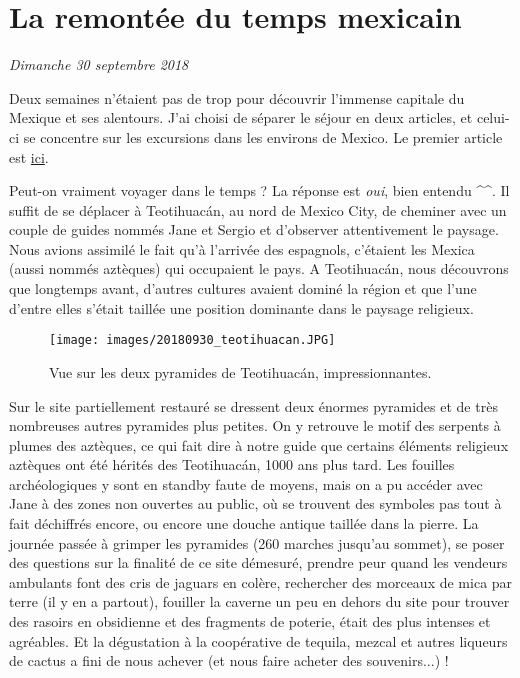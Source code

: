\hypertarget{la-remontuxe9e-du-temps-mexicain}{%
\section{La remontée du temps
mexicain}\label{la-remontuxe9e-du-temps-mexicain}}

\emph{Dimanche 30 septembre 2018}

Deux semaines n'étaient pas de trop pour découvrir l'immense capitale du
Mexique et ses alentours. J'ai choisi de séparer le séjour en deux
articles, et celui-ci se concentre sur les excursions dans les environs
de Mexico. Le premier article est
\href{/immersion-culturelle-mexico.html}{ici}.

Peut-on vraiment voyager dans le temps ? La réponse est \emph{oui}, bien
entendu \^{}\^{}. Il suffit de se déplacer à Teotihuacán, au nord de
Mexico City, de cheminer avec un couple de guides nommés Jane et Sergio
et d'observer attentivement le paysage. Nous avions assimilé le fait
qu'à l'arrivée des espagnols, c'étaient les Mexica (aussi nommés
aztèques) qui occupaient le pays. A Teotihuacán, nous découvrons que
longtemps avant, d'autres cultures avaient dominé la région et que l'une
d'entre elles s'était taillée une position dominante dans le paysage
religieux.

\begin{figure}
\centering
\texttt{[image: images/20180930\_teotihuacan.JPG]}
\caption{Vue sur les deux pyramides de Teotihuacán, impressionnantes.}
\end{figure}

Sur le site partiellement restauré se dressent deux énormes pyramides et
de très nombreuses autres pyramides plus petites. On y retrouve le motif
des serpents à plumes des aztèques, ce qui fait dire à notre guide que
certains éléments religieux aztèques ont été hérités des Teotihuacán,
1000 ans plus tard. Les fouilles archéologiques y sont en standby faute
de moyens, mais on a pu accéder avec Jane à des zones non ouvertes au
public, où se trouvent des symboles pas tout à fait déchiffrés encore,
ou encore une douche antique taillée dans la pierre. La journée passée à
grimper les pyramides (260 marches jusqu'au sommet), se poser des
questions sur la finalité de ce site démesuré, prendre peur quand les
vendeurs ambulants font des cris de jaguars en colère, rechercher des
morceaux de mica par terre (il y en a partout), fouiller la caverne un
peu en dehors du site pour trouver des rasoirs en obsidienne et des
fragments de poterie, était des plus intenses et agréables. Et la
dégustation à la coopérative de tequila, mezcal et autres liqueurs de
cactus a fini de nous achever (et nous faire acheter des souvenirs...) !

